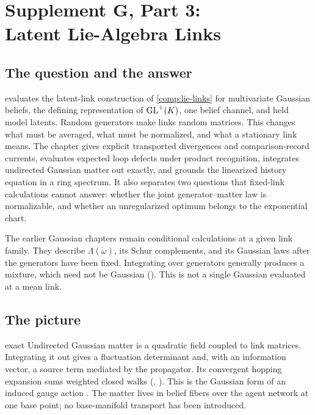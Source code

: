 \chapter[Supplement G, Part 3: Latent Lie-Algebra Links]{Supplement G, Part 3:\\Latent Lie-Algebra Links}
\label{comp:gaussian-latent-links}

\section{The question and the answer}

 evaluates the latent-link construction of
\cref{comp:lie-links} for multivariate Gaussian beliefs, the defining representation of
\(\mathrm{GL}^+(K)\), one belief channel, and held model latents. Random generators make links random
matrices. This changes what must be averaged, what must be normalized, and what a stationary link
means. The chapter gives explicit transported divergences and comparison-record currents,
evaluates expected loop defects under product recognition, integrates undirected Gaussian matter
out exactly, and grounds the linearized history equation in a ring spectrum. It also separates
two questions that fixed-link calculations cannot answer: whether the joint generator--matter
law is normalizable, and whether an unregularized optimum belongs to the exponential chart.

The earlier Gaussian chapters remain conditional calculations at a given link family. They
describe \(\Lambda(\mathring\omega)\), its Schur complements, and its Gaussian laws after the
generators have been fixed. Integrating over generators generally produces a mixture, which
need not be Gaussian (). This is not a single Gaussian
evaluated at a mean link.

\section{The picture}

\begin{analogy}{exact}
Undirected Gaussian matter is a quadratic field coupled to link matrices. Integrating it out
gives a fluctuation determinant and, with an information vector, a source term mediated by the
propagator. Its convergent hopping expansion sums weighted closed walks
(, ). This is the Gaussian form of an induced
gauge action \citep{KazakovMigdal1993}. The matter lives in belief fibers over the agent network
at one base point; no base-manifold transport has been introduced.
\end{analogy}

